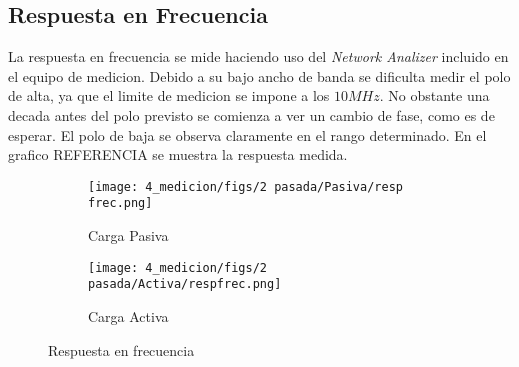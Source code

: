 \subsection{Respuesta en Frecuencia}

La respuesta en frecuencia se mide haciendo uso del \textit{Network Analizer} incluido en el equipo de medicion. Debido a su bajo ancho de banda se dificulta medir el polo de alta, ya que el limite de medicion se impone a los $10 MHz$. No obstante una decada antes del polo previsto se comienza a ver un cambio de fase, como es de esperar.
El polo de baja se observa claramente en el rango determinado. En el grafico REFERENCIA se muestra la respuesta medida.

\begin{figure}[ht]
    \begin{subfigure}{.45\textwidth}
      \centering
      \texttt{[image: 4\_medicion/figs/2 pasada/Pasiva/resp frec.png]}  
      \caption{Carga Pasiva}
      \label{fig:frec carga pasiva}
    \end{subfigure}
    \begin{subfigure}{.45\textwidth}
      \centering
      \texttt{[image: 4\_medicion/figs/2 pasada/Activa/respfrec.png]}  
      \caption{Carga Activa}
      \label{fig:frec carga activa}
    \end{subfigure}
    \caption{Respuesta en frecuencia}
    \label{fig:resp frec oscilo}
    \end{figure}




